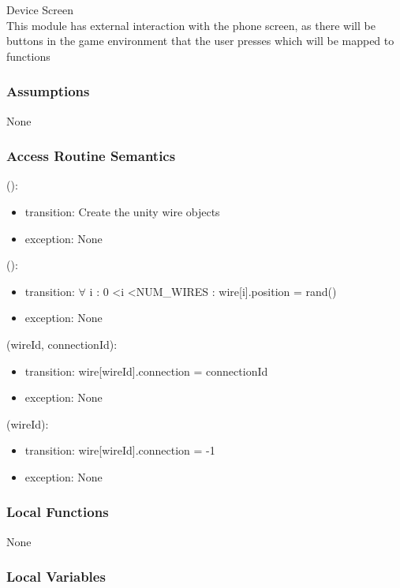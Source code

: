\documentclass[12pt, titlepage]{article}
\begin{document}
Device Screen\\
This module has external interaction with the phone screen, as there will be buttons in the game environment that the user presses which will be mapped to functions

\subsubsection{Assumptions}

None

\subsubsection{Access Routine Semantics}

():
\begin{itemize}
\item transition: Create the unity wire objects
\item exception: None
\end{itemize}

():
\begin{itemize}
\item transition: $\forall$ i : 0 \textless i \textless NUM\_WIRES : wire[i].position = rand()
\item exception: None
\end{itemize}

(wireId, connectionId):
\begin{itemize}
\item transition: wire[wireId].connection = connectionId
\item exception: None
\end{itemize}

(wireId):
\begin{itemize}
\item transition: wire[wireId].connection = -1
\item exception: None
\end{itemize}

\subsubsection{Local Functions}

None

\subsubsection{Local Variables}
\end{document}
